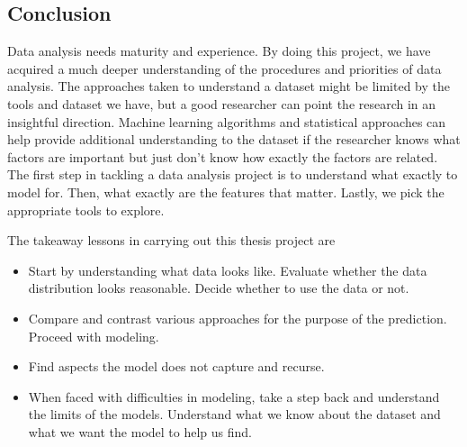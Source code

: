 \documentclass[]{article}
\begin{document}
\subsection{Conclusion}

Data analysis needs maturity and experience. By doing this project, we have acquired a much deeper understanding of the procedures and priorities of data analysis. The approaches taken to understand a dataset might be limited by the tools and dataset we have, but a good researcher can point the research in an insightful direction. Machine learning algorithms and statistical approaches can help provide additional understanding to the dataset if the researcher knows what factors are important but just don't know how exactly the factors are related. The first step in tackling a data analysis project is to understand what exactly to model for. Then, what exactly are the features that matter. Lastly, we pick the appropriate tools to explore. 

The takeaway lessons in carrying out this thesis project are

\begin{itemize}
\item
Start by understanding what data looks like. Evaluate whether the data distribution looks reasonable. Decide whether to use the data or not.
\item
Compare and contrast various approaches for the purpose of the prediction. Proceed with modeling.
\item
Find aspects the model does not capture and recurse. 
\item
When faced with difficulties in modeling, take a step back and understand the limits of the models. Understand what we know about the dataset and what we want the model to help us find. 
\end{itemize}


\newpage
\end{document}
